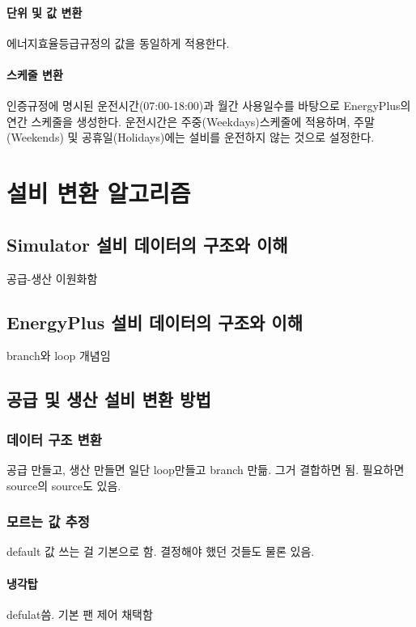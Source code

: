 \paragraph{단위 및 값 변환} 에너지효율등급규정의 값을 동일하게 적용한다.
\paragraph{스케줄 변환} 인증규정에 명시된 운전시간(07:00-18:00)과 월간 사용일수를 바탕으로 EnergyPlus의 연간 스케줄을 생성한다. 운전시간은 주중(Weekdays)스케줄에 적용하며, 주말(Weekends) 및 공휴일(Holidays)에는 설비를 운전하지 않는 것으로 설정한다.



\section{설비 변환 알고리즘}
\subsection{Simulator 설비 데이터의 구조와 이해}
공급-생산 이원화함

\subsection{EnergyPlus 설비 데이터의 구조와 이해}
branch와 loop 개념임

\subsection{공급 및 생산 설비 변환 방법}
\subsubsection{데이터 구조 변환}
공급 만들고, 생산 만들면 일단 loop만들고 branch 만듦.
그거 결합하면 됨.
필요하면 source의 source도 있음.

\subsubsection{모르는 값 추정}
default 값 쓰는 걸 기본으로 함. 결정해야 했던 것들도 물론 있음.
\paragraph{냉각탑} defulat씀. 기본 팬 제어 채택함
